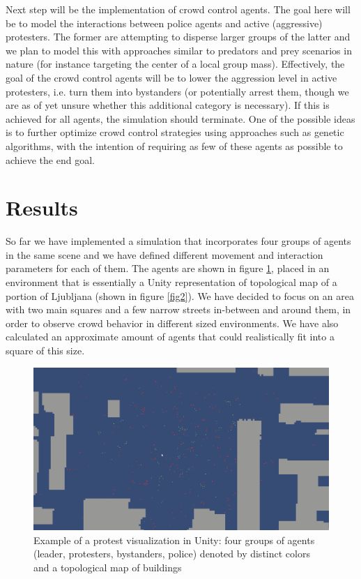 \documentclass[9pt]{pnas-new}
\begin{document}
\bigskip
Next step will be the implementation of crowd control agents. The goal here will be to model the interactions between police agents and active (aggressive) protesters. The former are attempting to disperse larger groups of the latter and we plan to model this with approaches similar to predators and prey scenarios in nature (for instance targeting the center of a local group mass). Effectively, the goal of the crowd control agents will be to lower the aggression level in active protesters, i.e. turn them into bystanders (or potentially arrest them, though we are as of yet unsure whether this additional category is necessary). If this is achieved for all agents, the simulation should terminate. One of the possible ideas is to further optimize crowd control strategies using approaches such as genetic algorithms, with the intention of requiring as few of these agents as possible to achieve the end goal. 

\section*{Results}

So far we have implemented a simulation that incorporates four groups of agents in the same scene and we have defined different movement and interaction parameters for each of them. The agents are shown in figure \ref{fig1}, placed in an environment that is essentially a Unity representation of topological map of a portion of Ljubljana (shown in figure \ref{fig2}). We have decided to focus on an area with two main squares and a few narrow streets in-between and around them, in order to observe crowd behavior in different sized environments. We have also calculated an approximate amount of agents that could realistically fit into a square of this size. 

\begin{figure}[H]
\begin{center}
\includegraphics[width=0.95\columnwidth]{simulation.png}
\end{center}
\caption{Example of a protest visualization in Unity: four groups of agents (leader, protesters, bystanders, police) denoted by distinct colors and a topological map of buildings}
\label{fig1}
\end{figure}
\end{document}

